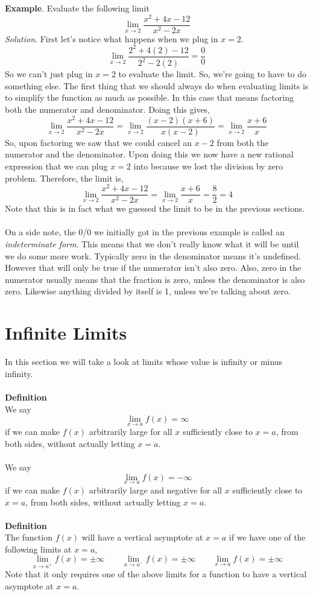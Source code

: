 \documentclass[10pt,reqno]{book}
\begin{document}
	
	\textbf{Example}. Evaluate the following limit
	\[ \lim\limits_{x \to 2} \frac{x^2+4x-12}{x^2-2x} \]
	\textit{Solution}. First let's notice what happens when we plug in $ x=2 $.
	\[ \lim\limits_{x \to 2} \frac{2^2 + 4(2) - 12}{2^2 - 2(2)} = \frac{0}{0} \]
	So we can't just plug in $ x=2 $ to evaluate the limit. So, we're going to have to do something else. The first thing that we should always do when evaluating limits is to simplify the function as much as possible. In this case that means factoring both the numerator and denominator. Doing this gives,
	\[ \lim\limits_{x \to 2} \frac{x^2+4x-12}{x^2-2x} = \lim\limits_{x \to 2} \frac{(x-2)(x+6)}{x(x-2)} = \lim\limits_{x \to 2} \frac{x+6}{x} \]
	So, upon factoring we saw that we could cancel an $ x-2 $ from both the numerator and the denominator. Upon doing this we now have a new rational expression that we can plug $ x=2 $ into because we lost the division by zero problem. Therefore, the limit is,
	\[ \lim\limits_{x \to 2} \frac{x^2+4x-12}{x^2-2x} = \lim\limits_{x \to 2} \frac{x+6}{x} = \frac{8}{2} = 4 \]
	Note that this is in fact what we guessed the limit to be in the previous sections.\\ \\
	On a side note, the 0/0 we initially got in the previous example is called an \textit{indeterminate form}. This means that we don't really know what it will be until we do some more work. Typically zero in the denominator means it's undefined. However that will only be true if the numerator isn't also zero. Also, zero in the numerator usually means that the fraction is zero, unless the denominator is also zero. Likewise anything divided by itself is 1, unless we're talking about zero.
	
	\section{Infinite Limits}
	
	In this section we will take a look at limits whose value is infinity or minus infinity.\\ \\
	\textbf{Definition}\\
	We say
	\[ \lim\limits_{x\to a} f(x) = \infty \]
	if we can make $ f(x) $ arbitrarily large for all $ x $ sufficiently close to $ x=a $, from both sides, without actually letting $ x=a $.\\ \\
	We say
	\[ \lim\limits_{x\to a} f(x) = -\infty \]
	if we can make $ f(x) $ arbitrarily large and negative for all $ x $ sufficiently close to $ x=a $, from both sides, without actually letting $ x=a $.\\ \\ 
	\textbf{Definition}\\
	The function $ f(x) $ will have a vertical asymptote at $ x=a $ if we have one of the following limits at $ x=a $,
	\[ \lim\limits_{x\to a^+} f(x) = \pm \infty \qquad \lim\limits_{x\to a^-} f(x) = \pm \infty \qquad \lim\limits_{x\to a} f(x) = \pm \infty  \]
	Note that it only requires one of the above limits for a function to have a vertical asymptote at $ x=a $.
	
\end{document}
